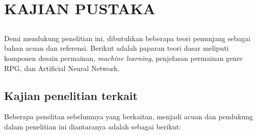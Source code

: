 \chapter{KAJIAN PUSTAKA}
\label{chap:chap2_kajian_pustaka}

\section*{}
Demi mendukung penelitian ini, dibutuhkan beberapa teori penunjang sebagai bahan acuan dan referensi. Berikut adalah paparan teori dasar meliputi komponen desain permainan, \textit{machine learning}, penjelasan permainan genre RPG, dan Artificial Neural Network.
\vspace{1ex}

\section{Kajian penelitian terkait}
\label{sec:sec2_kajian}
\vspace{1ex}

Beberapa penelitan sebelumnya yang berkaitan, menjadi acuan dan pendukung dalam penelitian ini diantaranya adalah sebagai berikut:

